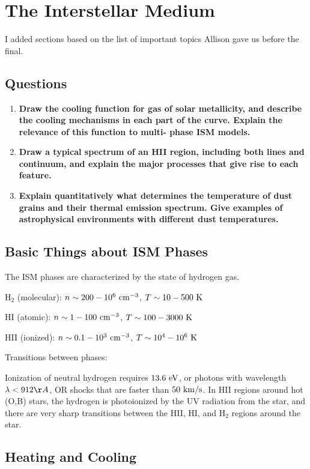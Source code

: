 \section{The Interstellar Medium}

I added sections based on the list of important topics Allison gave us 
before the final. 

\subsection{Questions}
\begin{enumerate}
\item \textbf{Draw the cooling function for gas of solar metallicity, and describe the cooling
      mechanisms in each part of the curve. Explain the relevance of this function to multi-
      phase ISM models.}
\item \textbf{Draw a typical spectrum of an HII region, including both lines and continuum, and
      explain the major processes that give rise to each feature.}
\item \textbf{Explain quantitatively what determines the temperature of dust grains and their
      thermal emission spectrum. Give examples of astrophysical environments with different
      dust temperatures.}
\end{enumerate}

\subsection{Basic Things about ISM Phases}

The ISM phases are characterized by the state of hydrogen gas.

H$_2$ (molecular): $n \sim 200-10^6~{\rm cm}^{-3}$, $T \sim 10-500~{\rm K}$

HI (atomic): $n \sim 1-100~{\rm cm}^{-3}$, $T \sim 100-3000~{\rm K}$
 
HII (ionized): $n \sim 0.1-10^3~{\rm cm}^{-3}$, $T \sim 10^4-10^6~{\rm K}$
 
 Transitions between phases:
 
 Ionization of neutral hydrogen requires $13.6~{\rm eV}$, or photons with wavelength $\lambda < 912 \AA$, OR shocks that are faster than $50~{\rm km/s}$. In HII regions around hot (O,B) stars, the hydrogen is photoionized by the UV radiation from the star, and there are very sharp transitions between the HII, HI, and H$_2$ regions around the star.

\subsection{Heating and Cooling}

